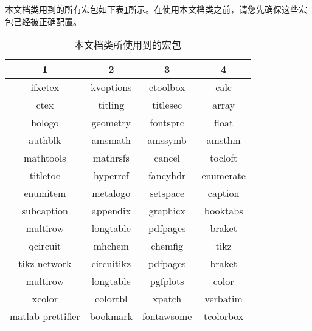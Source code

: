 本文档类用到的所有宏包如下表\ref{tab:dependencies}所示。在使用本文档类之前，请您先确保这些宏包已经被正确配置。

\begin{table}[H]
  \centering
  \caption{本文档类所使用到的宏包}\label{tab:dependencies}
  \begin{tabular}{cccc}
    \toprule
    1 & 2 & 3 & 4 \\
    \midrule
    ifxetex & kvoptions & etoolbox & calc \\
    ctex & titling & titlesec & array \\
    hologo & geometry & fontsprc & float \\
    authblk & amsmath & amssymb & amsthm \\
    mathtools & mathrsfs & cancel & tocloft \\
    titletoc & hyperref & fancyhdr & enumerate \\
    enumitem & metalogo & setspace & caption \\
    subcaption & appendix & graphicx & booktabs \\
    multirow & longtable & pdfpages & braket \\
    qcircuit & mhchem & chemfig & tikz \\
    tikz-network & circuitikz & pdfpages & braket \\
    multirow & longtable & pgfplots & color \\
    xcolor & colortbl & xpatch & verbatim \\
    matlab-prettifier & bookmark & fontawsome & tcolorbox \\
    \bottomrule
  \end{tabular}
\end{table}